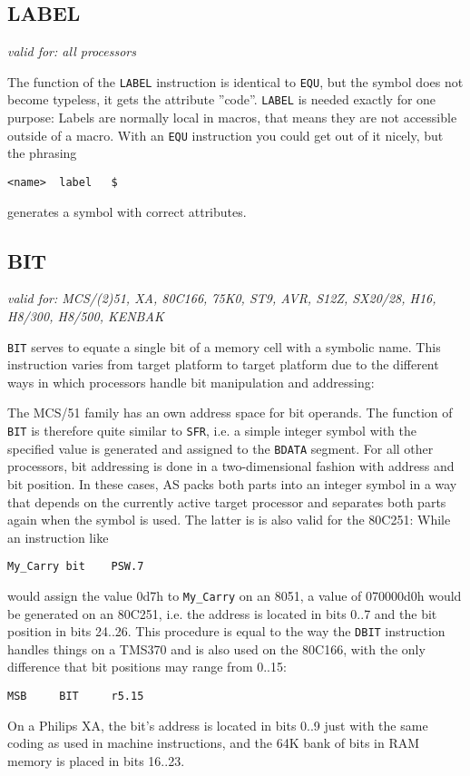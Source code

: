 \documentclass[12pt,twoside]{report}
\makeatletter
\newcommand{\tty}[1]{{\tt #1}}
\newcommand{\ttindex}[1]{\index{#1@{\tt #1}}}
\makeatother
\begin{document}
\subsection{LABEL}
\ttindex{LABEL}

{\em valid for: all processors}

The function of the \tty{LABEL} instruction is identical to \tty{EQU}, but
the symbol does not become typeless, it gets the attribute ''code''.
\tty{LABEL} is needed exactly for one purpose: Labels are normally local
in macros, that means they are not accessible outside of a macro.  With an
\tty{EQU} instruction you could get out of it nicely, but the phrasing
\begin{verbatim}
<name>  label   $
\end{verbatim}
generates a symbol with correct attributes.


\subsection{BIT}
\ttindex{BIT}

{\em valid for: MCS/(2)51, XA, 80C166, 75K0, ST9, AVR, S12Z, SX20/28, H16,
                H8/300, H8/500, KENBAK}

\tty{BIT} serves to equate a single bit of a memory cell with a symbolic
name.  This instruction varies from target platform to target platform due
to the different ways in which processors handle bit manipulation and
addressing:

The MCS/51 family has an own address space for bit operands.  The function
of \tty{BIT} is therefore quite similar to \tty{SFR}, i.e. a simple integer
symbol with the specified value is generated and assigned to the
\tty{BDATA} segment.  For all other processors, bit addressing is done in
a two-dimensional fashion with address and bit position.  In these cases,
AS packs both parts into an integer symbol in a way that depends on the
currently active target processor and separates both parts again when the
symbol is used.  The latter is is also valid for the 80C251: While an
instruction like
\begin{verbatim}
My_Carry bit    PSW.7
\end{verbatim}
would assign the value 0d7h to \tty{My\_Carry} on an 8051, a value of
070000d0h would be generated on an 80C251, i.e. the address is located in
bits 0..7 and the bit position in bits 24..26.  This procedure is equal to
the way the \tty{DBIT} instruction handles things on a TMS370 and is also
used on the 80C166, with the only difference that bit positions may range
from 0..15:
\begin{verbatim}
MSB     BIT     r5.15
\end{verbatim}
On a Philips XA, the bit's address is located in bits 0..9 just with
the same coding as used in machine instructions, and the 64K bank of
bits in RAM memory is placed in bits 16..23.
\end{document}
